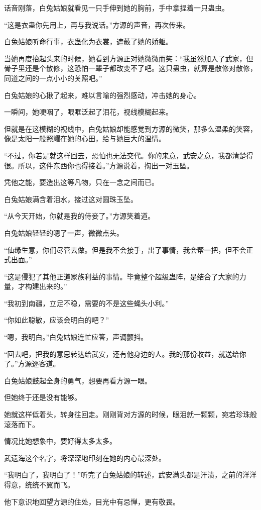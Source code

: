 \begin{this_body}
话音刚落，白兔姑娘就看见一只手伸到她的胸前，手中拿捏着一只蛊虫。

“这是衣蛊你先用上，再与我说话。”方源的声音，再次传来。

白兔姑娘听命行事，衣蛊化为衣裳，遮蔽了她的娇躯。

当她再度抬起头来的时候，她看到方源正对她微微而笑：“我虽然加入了武家，但骨子里还是个散修，这恐怕一辈子都改变不了吧。这只蛊虫，就算是散修对散修，同道之间的一点小小的关照吧。”

白兔姑娘的心揪了起来，难以言喻的强烈感动，冲击她的身心。

一瞬间，她哽咽了，眼眶泛起了泪花，视线模糊起来。

但就是在这模糊的视线中，白兔姑娘却能感觉到方源的微笑，那多么温柔的笑容，像是太阳一般照耀在她的心田，给与她巨大的温情。

“不过，你若是就这样回去，恐怕也无法交代。你的来意，武安之意，我都清楚得很。所以，这件东西你也得接着。”方源说着，掏出一对玉坠。

凭他之能，要造出这等凡物，只在一念之间而已。

白兔姑娘满含着泪水，接过这对圆珠玉坠。

“从今天开始，你就是我的侍妾了。”方源笑着道。

白兔姑娘轻轻的嗯了一声，微微点头。

“仙缘生意，你们尽管去做。但是我不会接手，出了事情，我会帮一把，但不会正式出面。”

“这是侵犯了其他正道家族利益的事情。毕竟整个超级蛊阵，是结合了大家的力量，才构建出来的。”

“我初到南疆，立足不稳，需要的不是这些蝇头小利。”

“你如此聪敏，应该会明白的吧？”

“嗯，我明白。”白兔姑娘连忙应答，声调颤抖。

“回去吧，把我的意思转达给武安，还有他身边的人。我的那份收益，就送给你了。”方源逐客道。

白兔姑娘鼓起全身的勇气，想要再看方源一眼。

但她终于还是没有能够。

她就这样低着头，转身往回走。刚刚背对方源的时候，眼泪就一颗颗，宛若珍珠般滚落而下。

情况比她想象中，要好得太多太多。

武遗海这个名字，将深深地印刻在她的内心最深处。

“我明白了，我明白了！”听完了白兔姑娘的转述，武安满头都是汗渍，之前的洋洋得意，统统不翼而飞。

他下意识地回望方源的住处，目光中有忌惮，更有敬畏。

\end{this_body}

